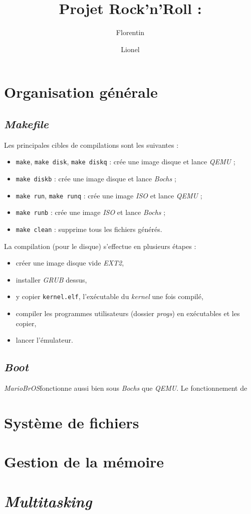 \documentclass[a4paper, 10pt, french]{article}
\title{Projet Rock'n'Roll : \mariobros}
\author{Florentin \bsc{Guth} \and Lionel \bsc{Zoubritzky}}
\newcommand{\source}[5]{
  \begin{table}[H]
    \centering
    \inputminted[frame=lines,linenos,style=colorful,fontfamily=tt,breaklines,autogobble,firstline=#3,firstnumber=#3,lastline=#4,label={#2[#3--#4]}]{#1}{../src/#2}
    \captionsetup{name=Listing,labelformat=listing,labelsep=endash,labelfont={sc}}
    \caption{#5}
  \end{table}
  }
\newcommand{\codeC}[1]{\texttt{#1}}
\newcommand{\code}[1]{\texttt{#1}}
\newcommand{\foreign}[1]{\emph{#1}}
\newcommand{\mariobros}{\foreign{MarioBrOS}}
\begin{document}
\maketitle


\tableofcontents

\clearpage

%
% 
% 
% 

\section{Organisation générale}

\subsection{\foreign{Makefile}}

Les principales cibles de compilations sont les suivantes :
\begin{itemize}
 \item \code{make}, \code{make disk}, \code{make diskq} : crée une image disque et lance \foreign{QEMU} ;
 \item \code{make diskb} : crée une image disque et lance \foreign{Bochs} ;
 \item \code{make run}, \code{make runq} : crée une image \foreign{ISO} et lance \foreign{QEMU} ;
 \item \code{make runb} : crée une image \foreign{ISO} et lance \foreign{Bochs} ;
 \item \code{make clean} : supprime tous les fichiers générés.
\end{itemize}

La compilation (pour le disque) s'effectue en plusieurs étapes :
\begin{itemize}
 \item créer une image disque vide \foreign{EXT2},
 \item installer \foreign{GRUB} dessus,
 \item y copier \code{kernel.elf}, l'exécutable du \foreign{kernel} une fois compilé,
 \item compiler les programmes utilisateurs (dossier \foreign{progs}) en exécutables et les copier,
 \item lancer l'émulateur.
\end{itemize}



\subsection{\foreign{Boot}}

\mariobros fonctionne aussi bien sous \foreign{Bochs} que \foreign{QEMU}. Le fonctionnement de


\section{Système de fichiers}

\section{Gestion de la mémoire}

\section{\foreign{Multitasking}}
\end{document}
